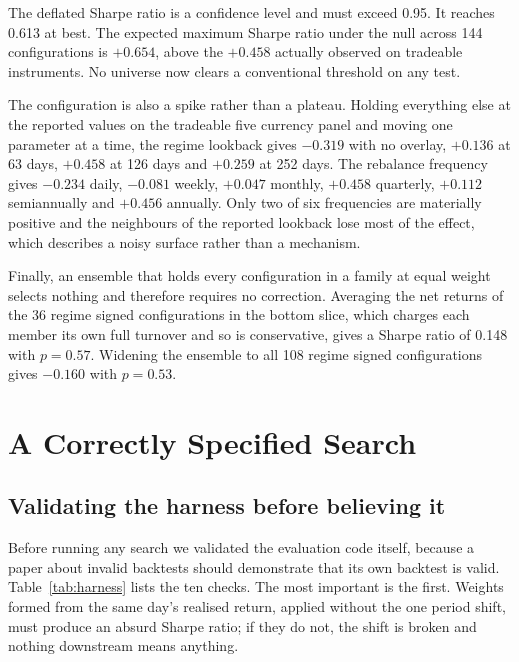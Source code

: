 \documentclass[10pt]{article}
\begin{document}
The deflated Sharpe ratio is a confidence level and must exceed 0.95. It reaches 0.613 at
best. The expected maximum Sharpe ratio under the null across 144 configurations is
$+0.654$, above the $+0.458$ actually observed on tradeable instruments. No universe now
clears a conventional threshold on any test.

The configuration is also a spike rather than a plateau. Holding everything else at the
reported values on the tradeable five currency panel and moving one parameter at a time,
the regime lookback gives $-0.319$ with no overlay, $+0.136$ at 63 days, $+0.458$ at 126
days and $+0.259$ at 252 days. The rebalance frequency gives $-0.234$ daily, $-0.081$
weekly, $+0.047$ monthly, $+0.458$ quarterly, $+0.112$ semiannually and $+0.456$ annually.
Only two of six frequencies are materially positive and the neighbours of the reported
lookback lose most of the effect, which describes a noisy surface rather than a mechanism.

Finally, an ensemble that holds every configuration in a family at equal weight selects
nothing and therefore requires no correction. Averaging the net returns of the 36 regime
signed configurations in the bottom slice, which charges each member its own full turnover
and so is conservative, gives a Sharpe ratio of 0.148 with $p=0.57$. Widening the ensemble
to all 108 regime signed configurations gives $-0.160$ with $p=0.53$.

\section{A Correctly Specified Search}\label{sec:exhaustive}

\subsection{Validating the harness before believing it}

Before running any search we validated the evaluation code itself, because a paper about
invalid backtests should demonstrate that its own backtest is valid.
Table~\ref{tab:harness} lists the ten checks. The most important is the first. Weights
formed from the same day's realised return, applied without the one period shift, must
produce an absurd Sharpe ratio; if they do not, the shift is broken and nothing downstream
means anything.
\end{document}
